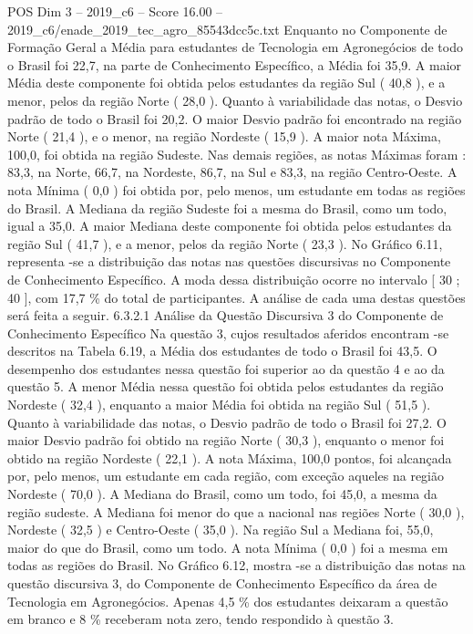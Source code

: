 \begin{textsample}{POS Dim 3 – 2019\_c6 – Score 16.00 – 2019\_c6/enade\_2019\_tec\_agro\_85543dcc5c.txt}
Enquanto no Componente de Formação Geral a Média para estudantes de Tecnologia em Agronegócios de todo o Brasil foi 22,7, na parte de Conhecimento Específico, a Média foi 35,9.
A maior Média deste componente foi obtida pelos estudantes da região Sul ( 40,8 ), e a menor, pelos da região Norte ( 28,0 ).
Quanto à variabilidade das notas, o Desvio padrão de todo o Brasil foi 20,2.
O maior Desvio padrão foi encontrado na região Norte ( 21,4 ), e o menor, na região Nordeste ( 15,9 ).
A maior nota Máxima, 100,0, foi obtida na região Sudeste.
Nas demais regiões, as notas Máximas foram : 83,3, na Norte, 66,7, na Nordeste, 86,7, na Sul e 83,3, na região Centro-Oeste.
A nota Mínima ( 0,0 ) foi obtida por, pelo menos, um estudante em todas as regiões do Brasil.
A Mediana da região Sudeste foi a mesma do Brasil, como um todo, igual a 35,0.
A maior Mediana deste componente foi obtida pelos estudantes da região Sul ( 41,7 ), e a menor, pelos da região Norte ( 23,3 ).
No Gráfico 6.11, representa -se a distribuição das notas nas questões discursivas no Componente de Conhecimento Específico.
A moda dessa distribuição ocorre no intervalo [ 30 ; 40 ], com 17,7 \% do total de participantes.
A análise de cada uma destas questões será feita a seguir. 6.3.2.1 Análise da Questão Discursiva 3 do Componente de Conhecimento Específico Na questão 3, cujos resultados aferidos encontram -se descritos na Tabela 6.19, a Média dos estudantes de todo o Brasil foi 43,5.
O desempenho dos estudantes nessa questão foi superior ao da questão 4 e ao da questão 5.
A menor Média nessa questão foi obtida pelos estudantes da região Nordeste ( 32,4 ), enquanto a maior Média foi obtida na região Sul ( 51,5 ).
Quanto à variabilidade das notas, o Desvio padrão de todo o Brasil foi 27,2.
O maior Desvio padrão foi obtido na região Norte ( 30,3 ), enquanto o menor foi obtido na região Nordeste ( 22,1 ).
A nota Máxima, 100,0 pontos, foi alcançada por, pelo menos, um estudante em cada região, com exceção aqueles na região Nordeste ( 70,0 ).
A Mediana do Brasil, como um todo, foi 45,0, a mesma da região sudeste.
A Mediana foi menor do que a nacional nas regiões Norte ( 30,0 ), Nordeste ( 32,5 ) e Centro-Oeste ( 35,0 ).
Na região Sul a Mediana foi, 55,0, maior do que do Brasil, como um todo.
A nota Mínima ( 0,0 ) foi a mesma em todas as regiões do Brasil.
No Gráfico 6.12, mostra -se a distribuição das notas na questão discursiva 3, do Componente de Conhecimento Específico da área de Tecnologia em Agronegócios.
Apenas 4,5 \% dos estudantes deixaram a questão em branco e 8 \% receberam nota zero, tendo respondido à questão 3.

\end{textsample}
